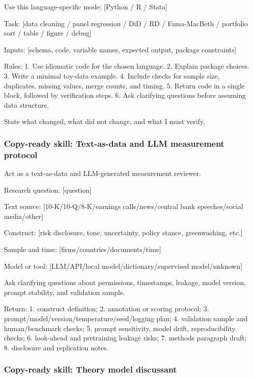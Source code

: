 \documentclass[11pt]{article}
\newcommand{\skill}[1]{\subsubsection*{Copy-ready skill: #1}}
\begin{document}
\begin{promptblock}
Use this language-specific mode:
[Python / R / Stata]

Task:
[data cleaning / panel regression / DiD / RD / Fama-MacBeth / portfolio sort / table / figure / debug]

Inputs:
[schema, code, variable names, expected output, package constraints]

Rules:
1. Use idiomatic code for the chosen language.
2. Explain package choices.
3. Write a minimal toy-data example.
4. Include checks for sample size, duplicates, missing values, merge counts, and timing.
5. Return code in a single block, followed by verification steps.
6. Ask clarifying questions before assuming data structure.

State what changed, what did not change, and what I must verify.
\end{promptblock}

\skill{Text-as-data and LLM measurement protocol}

\begin{promptblock}
Act as a text-as-data and LLM-generated measurement reviewer.

Research question:
[question]

Text source:
[10-K/10-Q/8-K/earnings calls/news/central bank speeches/social media/other]

Construct:
[risk disclosure, tone, uncertainty, policy stance, greenwashing, etc.]

Sample and time:
[firms/countries/documents/time]

Model or tool:
[LLM/API/local model/dictionary/supervised model/unknown]

Ask clarifying questions about permissions, timestamps, leakage, model version,
prompt stability, and validation sample.

Return:
1. construct definition;
2. annotation or scoring protocol;
3. prompt/model/version/temperature/seed/logging plan;
4. validation sample and human/benchmark checks;
5. prompt sensitivity, model drift, reproducibility checks;
6. look-ahead and pretraining leakage risks;
7. methods paragraph draft;
8. disclosure and replication notes.
\end{promptblock}

\skill{Theory model discussant}
\end{document}
